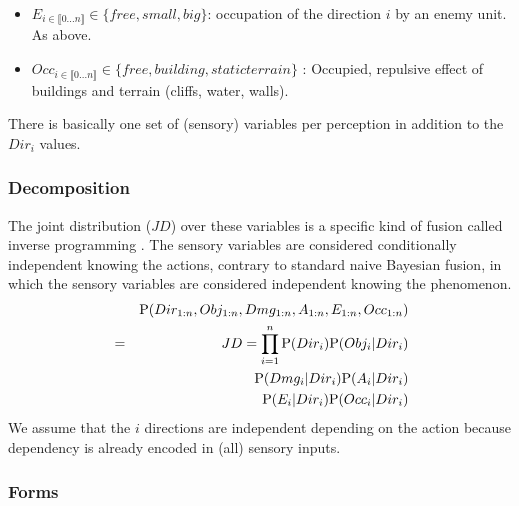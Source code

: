 \begin{itemize}
\item $E_{i \in \llbracket 0 \dots n\rrbracket } \in \{free, small, big\}$: occupation of the direction $i$ by an enemy unit. As above.

\item $Occ_{i \in \llbracket 0 \dots n\rrbracket } \in \{free, building, staticterrain\}$%
: Occupied, repulsive effect of buildings and terrain (cliffs, water, walls).
\end{itemize}

There is basically one set of (sensory) variables per perception in addition to the $Dir_i$ values. 

\subsubsection{Decomposition}

The joint distribution ($JD$) over these variables is a specific kind of fusion called inverse programming \citep{LeHy04}. The sensory variables are considered conditionally independent knowing the actions, contrary to standard naive Bayesian fusion, in which the sensory variables are considered independent knowing the phenomenon.
\begin{eqnarray}
&& \mathrm{P}(Dir_{1:n}, Obj_{1:n}, Dmg_{1:n}, A_{1:n}, E_{1:n}, Occ_{1:n})\\
& = & JD = \prod_{i=1}^{n} \mathrm{P}(Dir_i) \mathrm{P}(Obj_i | Dir_i) \\
                    && \mathrm{P}(Dmg_i | Dir_i) \mathrm{P}(A_i | Dir_i) \\
                    && \mathrm{P}(E_i | Dir_i) \mathrm{P}(Occ_i | Dir_i)
\end{eqnarray}
We assume that the $i$ directions are independent depending on the action because dependency is already encoded in (all) sensory inputs. 

\subsubsection{Forms}

